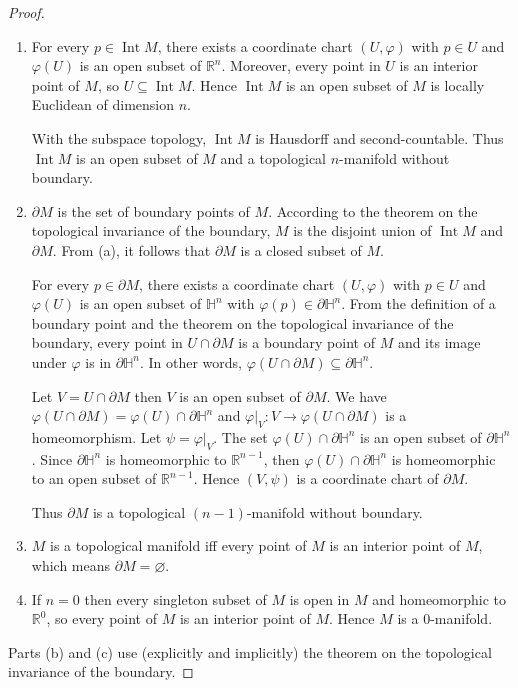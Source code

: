 \begin{proof}
    \begin{enumerate}[itemsep=0pt,label={(\alph*)}]
        \item For every \( p \in \operatorname{Int} M \), there exists a coordinate chart \( (U, \varphi) \) with \( p \in U \) and \( \varphi(U) \) is an open subset of \( \mathbb{R}^{n} \). Moreover, every point in \( U \) is an interior point of \( M \), so \( U \subseteq \operatorname{Int} M \). Hence \( \operatorname{Int} M \) is an open subset of \( M \) is locally Euclidean of dimension \( n \).

              With the subspace topology, \( \operatorname{Int} M \) is Hausdorff and second-countable. Thus \( \operatorname{Int} M \) is an open subset of \( M \) and a topological \( n \)-manifold without boundary.
        \item \( \partial M \) is the set of boundary points of \( M \). According to the theorem on the topological invariance of the boundary, \( M \) is the disjoint union of \( \operatorname{Int} M \) and \( \partial M \). From (a), it follows that \( \partial M \) is a closed subset of \( M \).

              For every \( p \in \partial M \), there exists a coordinate chart \( (U, \varphi) \) with \( p \in U \) and \( \varphi(U) \) is an open subset of \( \mathbb{H}^{n} \) with \( \varphi(p) \in \partial \mathbb{H}^{n} \). From the definition of a boundary point and the theorem on the topological invariance of the boundary, every point in \( U \cap \partial M \) is a boundary point of \( M \) and its image under \( \varphi \) is in \( \partial \mathbb{H}^{n} \). In other words, \( \varphi(U \cap \partial M) \subseteq \partial \mathbb{H}^{n} \).

              Let \( V = U \cap \partial M \) then \( V \) is an open subset of \( \partial M \). We have \( \varphi(U \cap \partial M) = \varphi(U) \cap \partial \mathbb{H}^{n} \) and \( \varphi\vert_{V}: V \to \varphi(U \cap \partial M) \) is a homeomorphism. Let \( \psi = \varphi\vert_{V} \). The set \( \varphi(U) \cap \partial \mathbb{H}^{n} \) is an open subset of \( \partial \mathbb{H}^{n} \). Since \( \partial \mathbb{H}^{n} \) is homeomorphic to \( \mathbb{R}^{n-1} \), then \( \varphi(U) \cap \partial \mathbb{H}^{n} \) is homeomorphic to an open subset of \( \mathbb{R}^{n-1} \). Hence \( (V, \psi) \) is a coordinate chart of \( \partial M \).

              Thus \( \partial M \) is a topological \( (n - 1) \)-manifold without boundary.
        \item \( M \) is a topological manifold iff every point of \( M \) is an interior point of \( M \), which means \( \partial M = \varnothing \).
        \item If \( n = 0 \) then every singleton subset of \( M \) is open in \( M \) and homeomorphic to \( \mathbb{R}^{0} \), so every point of \( M \) is an interior point of \( M \). Hence \( M \) is a \( 0 \)-manifold.
    \end{enumerate}

    Parts (b) and (c) use (explicitly and implicitly) the theorem on the topological invariance of the boundary.
\end{proof}

